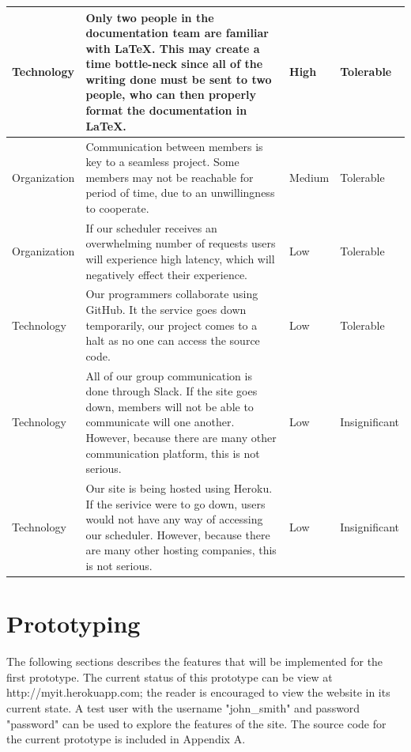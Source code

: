 \documentclass[12pt]{article}
\begin{document}
\begin{center}
\begin{longtable}{| p{2cm} | p{9cm} | p{2cm} | p{2cm} |}
Technology		&  Only two people in the documentation team are familiar with LaTeX. This may create a time bottle-neck since all of the writing done must be sent to two people, who can then properly format the documentation in LaTeX. & High & Tolerable\\ \hline
Organization  &  Communication between members is key to a seamless project. Some members may not be reachable for period of time, due to an unwillingness to cooperate. & Medium & Tolerable\\ \hline
Organization  &  If our scheduler receives an overwhelming number of requests users will experience high latency, which will negatively effect their experience. & Low & Tolerable\\ \hline
Technology		&  Our programmers collaborate using GitHub. It the service goes down temporarily, our project comes to a halt as no one can access the source code. & Low & Tolerable\\ \hline

Technology		&  All of our group communication is done through Slack. If the site goes down, members will not be able to communicate will one another. However, because there are many other communication platform, this is not serious. & Low & Insignificant \\ \hline
Technology		& Our site is being hosted using Heroku. If the serivice were to go down, users would not have any way of accessing our scheduler. However, because there are many other hosting companies, this is not serious.  & Low & Insignificant \\ \hline



\end{longtable}
\end{center}
%

\vfill
\newpage

\section{Prototyping}
The following sections describes the features that will be implemented for the first prototype. The current status of this prototype can be view at 
http://myit.herokuapp.com; the reader is encouraged to view the website in its current state. A test user with the username "john\_smith" and password "password" can be used to explore the features of the site. The source code for the current prototype is included in Appendix A.
\end{document}
